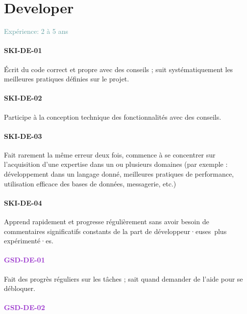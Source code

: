 \documentclass[a4paper, french, openany, 12pt]{book}
\newcommand\dex[1]{\textcolor{BrickRed}{\textbf{\uppercase{ski-{#1}}}}}
\newcommand\str[1]{\textcolor{DarkOrchid}{\textbf{\uppercase{gsd-{#1}}}}}
\newcommand\xp[1]{\textcolor{CadetBlue}{Expérience: {#1} ans}}
\newcommand\devs{développeur·euses}
\begin{document}
\chapter{Developer}

\xp{2 à 5}

\begin{multicols}{2}

  \subsubsection*{\dex{de-01}}

  Écrit du code correct et propre avec des conseils ; suit systématiquement les meilleures pratiques définies sur le
  projet.

  \subsubsection*{\dex{de-02}}

  Participe à la conception technique des fonctionnalités avec des conseils.

  \subsubsection*{\dex{de-03}}

  Fait rarement la même erreur deux fois, commence à se concentrer sur l'acquisition d'une expertise dans un ou plusieurs 
  domaines (par exemple : développement dans un langage donné, meilleures pratiques de performance, utilisation efficace 
  des bases de données, messagerie, etc.)

  \subsubsection*{\dex{de-04}}

  Apprend rapidement et progresse régulièrement sans avoir besoin de commentaires significatifs constants de la part 
  de \devs\ plus expérimenté·es.

  \subsubsection*{\str{de-01}}

  Fait des progrès réguliers sur les tâches ; sait quand demander de l'aide pour se débloquer.

  \subsubsection*{\str{de-02}}


\end{multicols}
\end{document}
